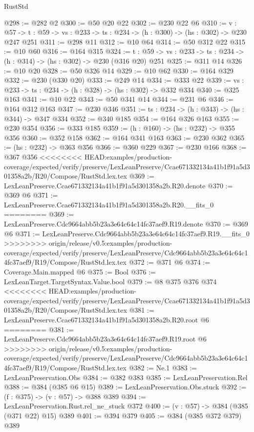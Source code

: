 \begin{lexlean}{RustStd}
\begin{coremodule}
{\begin{coremodule}
@298 := @282 @2
@300 := @50 @20 @22
@302 := @230 @22 @6
@310 := {v : @57} ->
  {t : @59} -> {vs : @233} -> {ts : @234} -> (h : @300) -> (hs : @302) -> @230 @247 @251
@311 := @298 @11
@312 := @10 @64
@314 := @50 @312 @22
@315 := @10 @60
@316 := @164 @315
@324 := {t : @59} -> {vs : @233} -> {ts : @234} -> (h : @314) -> (hs : @302) -> @230 (@316 @20) @251
@325 := @311 @14
@326 := @10 @20
@328 := @50 @326 @14
@329 := @10 @62
@330 := @164 @329
@332 := @230 (@330 @20)
@333 := @249 @14
@334 := @333 @22
@339 := {vs : @233} -> {ts : @234} -> (h : @328) -> (hs : @302) -> @332 @334
@340 := @325 @163
@341 := @10 @22
@343 := @50 @341 @14
@344 := @231 @6
@346 := @164 @312 @163
@347 := @230 @346
@351 := {ts : @234} -> (h : @343) -> (hs : @344) -> @347 @334
@352 := @340 @185
@354 := @164 @326 @163
@355 := @230 @354
@356 := @333 @185
@359 := (h : @160) -> (hs : @232) -> @355 @356
@360 := @352 @158
@362 := @164 @341 @163
@363 := @230 @362
@365 := (hs : @232) -> @363 @356
@366 := @360 @229
@367 := @230 @166
@368 := @367 @356
<<<<<<<< HEAD:examples/production-coverage/expected/verify/preserve/LexLeanPreserve/Ccae671332134a41b1f91a5d301358a2b/R20/Compose/RustStd.lex.tex
@369 := LexLeanPreserve.Ccae671332134a41b1f91a5d301358a2b.R20.denote
@370 := @369 @6
@371 := LexLeanPreserve.Ccae671332134a41b1f91a5d301358a2b.R20.__fits_0
========
@369 := LexLeanPreserve.Cdc9664abb5b23a3e64c64c14fc37aef9.R19.denote
@370 := @369 @6
@371 := LexLeanPreserve.Cdc9664abb5b23a3e64c64c14fc37aef9.R19.__fits_0
>>>>>>>> origin/release/v0.5:examples/production-coverage/expected/verify/preserve/LexLeanPreserve/Cdc9664abb5b23a3e64c64c14fc37aef9/R19/Compose/RustStd.lex.tex
@372 := @371 @6
@374 := Coverage.Main.mapped @6
@375 := Bool
@376 := LexLeanTarget.TargetSyntax.Value.bool
@379 := @8 @375 @376 @374
<<<<<<<< HEAD:examples/production-coverage/expected/verify/preserve/LexLeanPreserve/Ccae671332134a41b1f91a5d301358a2b/R20/Compose/RustStd.lex.tex
@381 := LexLeanPreserve.Ccae671332134a41b1f91a5d301358a2b.R20.root @6
========
@381 := LexLeanPreserve.Cdc9664abb5b23a3e64c64c14fc37aef9.R19.root @6
>>>>>>>> origin/release/v0.5:examples/production-coverage/expected/verify/preserve/LexLeanPreserve/Cdc9664abb5b23a3e64c64c14fc37aef9/R19/Compose/RustStd.lex.tex
@382 := Ne.{1}
@383 := LexLeanPreservation.Obs
@384 := @382 @383
@385 := LexLeanPreservation.Rel
@388 := @384 (@385 @6 @15)
@389 := LexLeanPreservation.Obs.stuck
@392 := (f : @375) -> (v : @57) -> @388 @389
@394 := LexLeanPreservation.Rust.rel_ne_stuck @372
@400 := (v : @57) -> @384 (@385 (@371 @22) @15) @389
@401 := @394 @379
@405 := @384 (@385 @372 @379) @389

\end{coremodule}}
\end{coremodule}
\end{lexlean}

